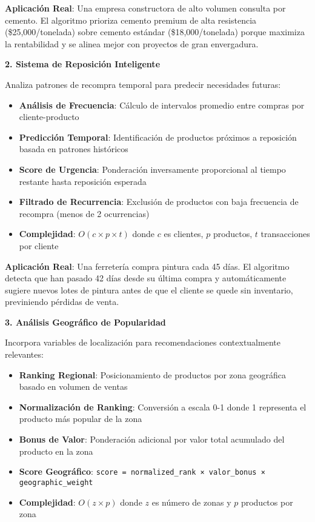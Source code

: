 \documentclass[twocolumn]{article}
\begin{document}
\textbf{Aplicación Real}: Una empresa constructora de alto volumen consulta por cemento. El algoritmo prioriza cemento premium de alta resistencia (\$25,000/tonelada) sobre cemento estándar (\$18,000/tonelada) porque maximiza la rentabilidad y se alinea mejor con proyectos de gran envergadura.

\vspace{0.3cm}

\textbf{2. Sistema de Reposición Inteligente}

Analiza patrones de recompra temporal para predecir necesidades futuras:

\begin{itemize}
    \item \textbf{Análisis de Frecuencia}: Cálculo de intervalos promedio entre compras por cliente-producto
    \item \textbf{Predicción Temporal}: Identificación de productos próximos a reposición basada en patrones históricos
    \item \textbf{Score de Urgencia}: Ponderación inversamente proporcional al tiempo restante hasta reposición esperada
    \item \textbf{Filtrado de Recurrencia}: Exclusión de productos con baja frecuencia de recompra (menos de 2 ocurrencias)
    \item \textbf{Complejidad}: \(O(c \times p \times t)\) donde \(c\) es clientes, \(p\) productos, \(t\) transacciones por cliente
\end{itemize}

\textbf{Aplicación Real}: Una ferretería compra pintura cada 45 días. El algoritmo detecta que han pasado 42 días desde su última compra y automáticamente sugiere nuevos lotes de pintura antes de que el cliente se quede sin inventario, previniendo pérdidas de venta.

\textbf{3. Análisis Geográfico de Popularidad}

Incorpora variables de localización para recomendaciones contextualmente relevantes:

\begin{itemize}
    \item \textbf{Ranking Regional}: Posicionamiento de productos por zona geográfica basado en volumen de ventas
    \item \textbf{Normalización de Ranking}: Conversión a escala 0-1 donde 1 representa el producto más popular de la zona
    \item \textbf{Bonus de Valor}: Ponderación adicional por valor total acumulado del producto en la zona
    \item \textbf{Score Geográfico}: \texttt{score = normalized\_rank × valor\_bonus × geographic\_weight}
    \item \textbf{Complejidad}: \(O(z \times p)\) donde \(z\) es número de zonas y \(p\) productos por zona
\end{itemize}
\end{document}

